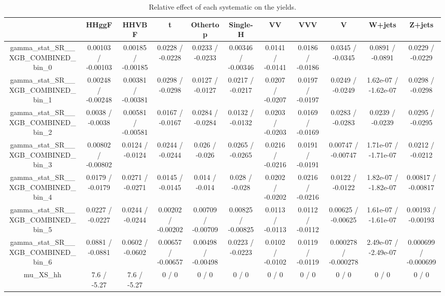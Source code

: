 \documentclass[10pt]{article}
\begin{document}
\begin{table}[htbp]
\begin{center}
\begin{tabular}{|c|c|c|c|c|c|c|c|c|c|c|}
\hline 
      & HHggF      & HHVBF      & t      & Othertop      & Single-H      & VV      & VVV      & V      & W+jets      & Z+jets \\ 
\hline 
  gamma_stat_SR__XGB_COMBINED_bin_0 & 0.00103 / -0.00103 & 0.00185 / -0.00185 & 0.0228 / -0.0228 & 0.0233 / -0.0233 & 0.00346 / -0.00346 & 0.0141 / -0.0141 & 0.0186 / -0.0186 & 0.0345 / -0.0345 & 0.0891 / -0.0891 & 0.0229 / -0.0229 \\ 
  gamma_stat_SR__XGB_COMBINED_bin_1 & 0.00248 / -0.00248 & 0.00381 / -0.00381 & 0.0298 / -0.0298 & 0.0127 / -0.0127 & 0.0217 / -0.0217 & 0.0207 / -0.0207 & 0.0197 / -0.0197 & 0.0249 / -0.0249 & 1.62e-07 / -1.62e-07 & 0.0298 / -0.0298 \\ 
  gamma_stat_SR__XGB_COMBINED_bin_2 & 0.0038 / -0.0038 & 0.00581 / -0.00581 & 0.0167 / -0.0167 & 0.0284 / -0.0284 & 0.0132 / -0.0132 & 0.0203 / -0.0203 & 0.0169 / -0.0169 & 0.0283 / -0.0283 & 0.0239 / -0.0239 & 0.0295 / -0.0295 \\ 
  gamma_stat_SR__XGB_COMBINED_bin_3 & 0.00802 / -0.00802 & 0.0124 / -0.0124 & 0.0244 / -0.0244 & 0.026 / -0.026 & 0.0265 / -0.0265 & 0.0216 / -0.0216 & 0.0191 / -0.0191 & 0.00747 / -0.00747 & 1.71e-07 / -1.71e-07 & 0.0212 / -0.0212 \\ 
  gamma_stat_SR__XGB_COMBINED_bin_4 & 0.0179 / -0.0179 & 0.0271 / -0.0271 & 0.0145 / -0.0145 & 0.014 / -0.014 & 0.028 / -0.028 & 0.0202 / -0.0202 & 0.0216 / -0.0216 & 0.0122 / -0.0122 & 1.82e-07 / -1.82e-07 & 0.00817 / -0.00817 \\ 
  gamma_stat_SR__XGB_COMBINED_bin_5 & 0.0227 / -0.0227 & 0.0244 / -0.0244 & 0.00202 / -0.00202 & 0.00709 / -0.00709 & 0.00825 / -0.00825 & 0.0113 / -0.0113 & 0.0112 / -0.0112 & 0.00625 / -0.00625 & 1.61e-07 / -1.61e-07 & 0.00193 / -0.00193 \\ 
  gamma_stat_SR__XGB_COMBINED_bin_6 & 0.0881 / -0.0881 & 0.0602 / -0.0602 & 0.00657 / -0.00657 & 0.00498 / -0.00498 & 0.0223 / -0.0223 & 0.0102 / -0.0102 & 0.0119 / -0.0119 & 0.000278 / -0.000278 & 2.49e-07 / -2.49e-07 & 0.000699 / -0.000699 \\ 
  mu_XS_hh & 7.6 / -5.27 & 7.6 / -5.27 & 0 / 0 & 0 / 0 & 0 / 0 & 0 / 0 & 0 / 0 & 0 / 0 & 0 / 0 & 0 / 0 \\ 
\hline 
\end{tabular} 
\caption{Relative effect of each systematic on the yields.} 
\end{center} 
\end{table} 
\end{document}
